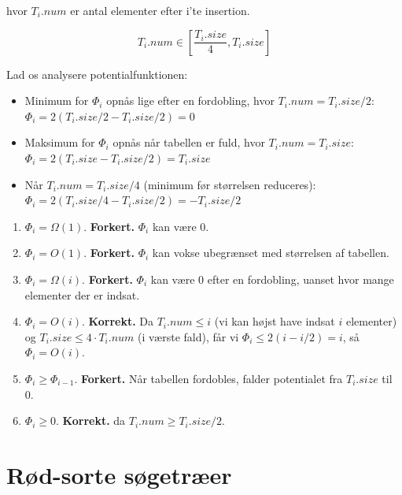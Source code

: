\documentclass{article}
\theoremstyle{definition}
\begin{document}
hvor $T_i.num$ er antal elementer efter i'te insertion.

\[T_i.num \in [\frac{T_i.size}{4}, T_i.size]\]

Lad os analysere potentialfunktionen:

\begin{itemize}
\item Minimum for $\Phi_i$ opnås lige efter en fordobling, hvor $T_i.num = T_i.size/2$:\\
$\Phi_i = 2(T_i.size/2 - T_i.size/2) = 0$

\item Maksimum for $\Phi_i$ opnås når tabellen er fuld, hvor $T_i.num = T_i.size$:\\
$\Phi_i = 2(T_i.size - T_i.size/2) = T_i.size$

\item Når $T_i.num = T_i.size/4$ (minimum før størrelsen reduceres):\\
$\Phi_i = 2(T_i.size/4 - T_i.size/2) = -T_i.size/2$
\end{itemize}



\begin{enumerate}
\item $\Phi_i = \Omega(1)$. \textbf{Forkert.} $\Phi_i$ kan være 0.

\item $\Phi_i = O(1)$. \textbf{Forkert.} $\Phi_i$ kan vokse ubegrænset med størrelsen af tabellen.

\item $\Phi_i = \Omega(i)$. \textbf{Forkert.} $\Phi_i$ kan være 0 efter en fordobling, uanset hvor mange elementer der er indsat.

\item $\Phi_i = O(i)$. \textbf{Korrekt.} Da $T_i.num \leq i$ (vi kan højst have indsat $i$ elementer) og $T_i.size \leq 4 \cdot T_i.num$ (i værste fald), får vi $\Phi_i \leq 2(i - i/2) = i$, så $\Phi_i = O(i)$.

\item $\Phi_i \geq \Phi_{i-1}$. \textbf{Forkert.} Når tabellen fordobles, falder potentialet fra $T_i.size$ til 0.

\item $\Phi_i \geq 0$. \textbf{Korrekt.} da $T_i.num \geq T_i.size/2$.
\end{enumerate}

\section{Rød-sorte søgetræer}
\end{document}
